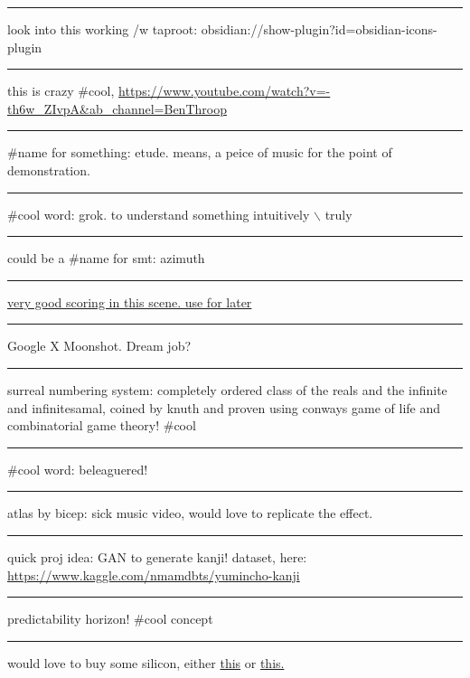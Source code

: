 \documentclass[letterpaper]{article}
\begin{document}
\noindent\rule{\textwidth}{0.5pt}

look into this working /w taproot:
obsidian://show-plugin?id=obsidian-icons-plugin

\noindent\rule{\textwidth}{0.5pt}

this is crazy \#cool,
\url{https://www.youtube.com/watch?v=-th6w\_ZIvpA\&ab\_channel=BenThroop}

\noindent\rule{\textwidth}{0.5pt}

\#name for something: etude. means, a peice of music for the point of
demonstration.

\noindent\rule{\textwidth}{0.5pt}

\#cool word: grok. to understand something intuitively $\backslash$ truly

\noindent\rule{\textwidth}{0.5pt}

could be a \#name for smt: azimuth

\noindent\rule{\textwidth}{0.5pt}

\href{https://www.youtube.com/watch?v=uvap4gEOC5I\&ab\_channel=SonyPicturesHomeEntertainment}{very
good scoring in this scene. use for later}

\noindent\rule{\textwidth}{0.5pt}

Google X Moonshot. Dream job?

\noindent\rule{\textwidth}{0.5pt}

surreal numbering system: completely ordered class of the reals and the
infinite and infinitesamal, coined by knuth and proven using conways
game of life and combinatorial game theory! \#cool

\noindent\rule{\textwidth}{0.5pt}

\#cool word: beleaguered!

\noindent\rule{\textwidth}{0.5pt}

atlas by bicep: sick music video, would love to replicate the effect.

\noindent\rule{\textwidth}{0.5pt}

quick proj idea: GAN to generate kanji! dataset, here:
\url{https://www.kaggle.com/nmamdbts/yumincho-kanji}

\noindent\rule{\textwidth}{0.5pt}

predictability horizon! \#cool concept

\noindent\rule{\textwidth}{0.5pt}

would love to buy some silicon, either
\href{https://www.amazon.com/Silicon-Metal-99-999-Pure/dp/B08FVLJM8L}{this}
or
\href{https://www.amazon.com/Silicon-Wafer-Single-Sided-Polish/dp/B08RZ5ZYNF/}{this.}
\end{document}
